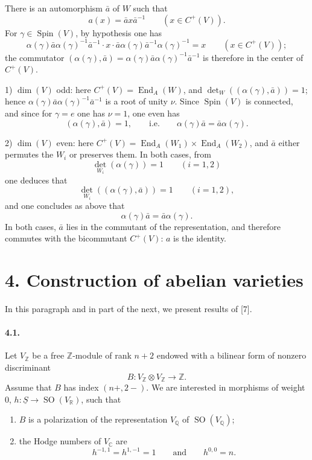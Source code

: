 \documentclass[10pt]{article}
\newcommand{\C}{\mathbb{C}}
\newcommand{\Q}{\mathbb{Q}}
\newcommand{\R}{\mathbb{R}}
\newcommand{\Z}{\mathbb{Z}}
\newcommand{\End}{\operatorname{End}}
\newcommand{\SO}{\operatorname{SO}}
\newcommand{\Spin}{\operatorname{Spin}}
\begin{document}
There is an automorphism $\bar a$ of $W$ such that
\[
a(x)=\bar a x\bar a^{-1}\qquad(x\in C^+(V)).
\]
For $\gamma\in\Spin(V)$, by hypothesis one has
\[
\alpha(\gamma)\bar a\alpha(\gamma)^{-1}\bar a^{-1}\cdot x\cdot \bar a\alpha(\gamma)\bar a^{-1}\alpha(\gamma)^{-1}=x\qquad(x\in C^+(V));
\]
the commutator $(\alpha(\gamma),\bar a)=\alpha(\gamma)\bar a\alpha(\gamma)^{-1}\bar a^{-1}$ is therefore in the center of $C^+(V)$.

1) $\dim(V)$ odd: here $C^+(V)=\End_A(W)$, and $\det_W((\alpha(\gamma),\bar a))=1$; hence $\alpha(\gamma)\bar a\alpha(\gamma)^{-1}\bar a^{-1}$ is a root of unity $\nu$. Since $\Spin(V)$ is connected, and since for $\gamma=e$ one has $\nu=1$, one even has
\[
(\alpha(\gamma),\bar a)=1,
\qquad\text{i.e.}\qquad
\alpha(\gamma)\bar a=\bar a\alpha(\gamma).
\]

2) $\dim(V)$ even: here $C^+(V)=\End_A(W_1)\times\End_A(W_2)$, and $\bar a$ either permutes the $W_i$ or preserves them. In both cases, from
\[
\det_{W_i}(\alpha(\gamma))=1\qquad(i=1,2)
\]
one deduces that
\[
\det_{W_i}((\alpha(\gamma),\bar a))=1\qquad(i=1,2),
\]
and one concludes as above that
\[
\alpha(\gamma)\bar a=\bar a\alpha(\gamma).
\]
In both cases, $\bar a$ lies in the commutant of the representation, and therefore commutes with the bicommutant $C^+(V)$: $a$ is the identity.

\section*{4. Construction of abelian varieties}

In this paragraph and in part of the next, we present results of [7].

\paragraph{4.1.} Let $V_\Z$ be a free $\Z$-module of rank $n+2$ endowed with a bilinear form of nonzero discriminant
\[
B:V_\Z\otimes V_\Z\longrightarrow\Z.
\]
Assume that $B$ has index $(n+,2-)$. We are interested in morphisms of weight $0$, $h:\underline S\to\SO(V_\R)$, such that
\begin{enumerate}[label=\arabic*)]
\item $B$ is a polarization of the representation $V_\Q$ of $\SO(V_\Q)$;
\item the Hodge numbers of $V_\C$ are
\[
h^{-1,1}=h^{1,-1}=1\qquad\text{and}\qquad h^{0,0}=n.
\]
\end{enumerate}
\end{document}

